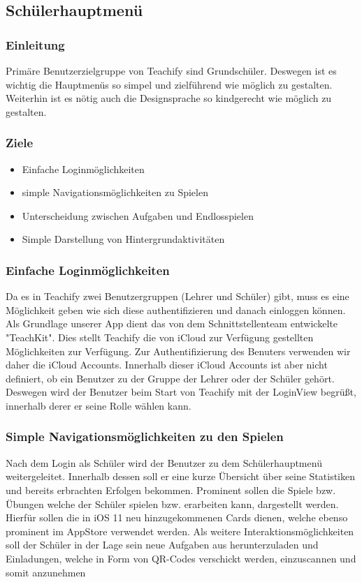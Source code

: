 \subsection{Schülerhauptmenü}
\subsubsection{Einleitung}
Primäre Benutzerzielgruppe von Teachify sind Grundschüler. Deswegen ist es wichtig die Hauptmenüs so simpel und zielführend wie möglich zu gestalten. Weiterhin ist es nötig auch die Designsprache so kindgerecht wie möglich zu gestalten.

\subsubsection{Ziele}
\begin{itemize}
    \item Einfache Loginmöglichkeiten
    \item simple Navigationsmöglichkeiten zu Spielen
    \item Unterscheidung zwischen Aufgaben und Endlosspielen
    \item Simple Darstellung von Hintergrundaktivitäten
\end{itemize}

\subsubsection{Einfache Loginmöglichkeiten}
Da es in Teachify zwei Benutzergruppen (Lehrer und Schüler) gibt, muss es eine Möglichkeit geben wie sich diese authentifizieren und danach einloggen können. Als Grundlage unserer App dient das von dem Schnittstellenteam entwickelte "TeachKit". Dies stellt Teachify die von iCloud zur Verfügung gestellten Möglichkeiten zur Verfügung. Zur Authentifizierung des Benuters verwenden wir daher die iCloud Accounts. Innerhalb dieser iCloud Accounts ist aber nicht definiert, ob ein Benutzer zu der Gruppe der Lehrer oder der Schüler gehört. Deswegen wird der Benutzer beim Start von Teachify mit der LoginView begrüßt, innerhalb derer er seine Rolle wählen kann.

\subsubsection{Simple Navigationsmöglichkeiten zu den Spielen}
Nach dem Login als Schüler wird der Benutzer zu dem Schülerhauptmenü weitergeleitet. Innerhalb dessen soll er eine kurze Übersicht über seine Statistiken und bereits erbrachten Erfolgen bekommen. Prominent sollen die Spiele bzw. Übungen welche der Schüler spielen bzw. erarbeiten kann, dargestellt werden. Hierfür sollen die in iOS 11 neu hinzugekommenen Cards dienen, welche ebenso prominent im AppStore verwendet werden. Als weitere Interaktionsmöglichkeiten soll der Schüler in der Lage sein neue Aufgaben aus herunterzuladen und Einladungen, welche in Form von QR-Codes verschickt werden, einzuscannen und somit anzunehmen

